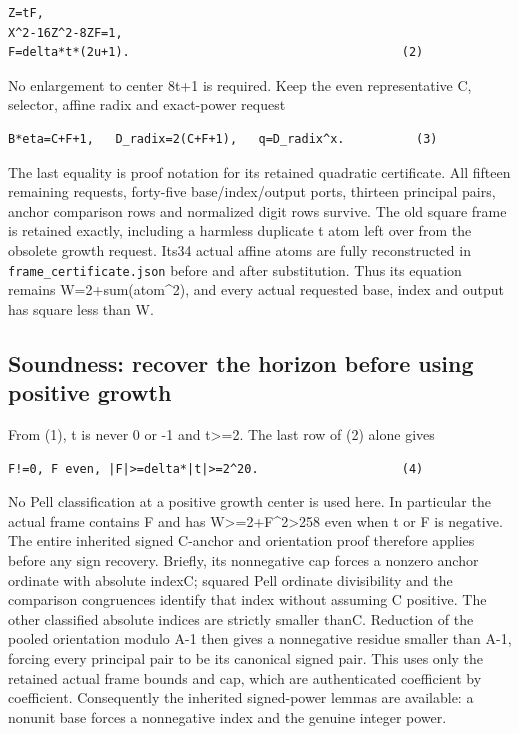 \begin{verbatim}
Z=tF,
X^2-16Z^2-8ZF=1,
F=delta*t*(2u+1).                                      (2)
\end{verbatim}

No enlargement to center 8t+1 is required. Keep the even representative
C, selector, affine radix and exact-power request

\begin{verbatim}
B*eta=C+F+1,   D_radix=2(C+F+1),   q=D_radix^x.          (3)
\end{verbatim}

The last equality is proof notation for its retained quadratic
certificate. All fifteen remaining requests, forty-five
base/index/output ports, thirteen principal pairs, anchor comparison
rows and normalized digit rows survive. The old square frame is retained
exactly, including a harmless duplicate t atom left over from the
obsolete growth request. Its34 actual affine atoms are fully
reconstructed in \nolinkurl{frame_certificate.json} before and after
substitution. Thus its equation remains W=2+sum(atom\^{}2), and every
actual requested base, index and output has square less than W.

\subsection{Soundness: recover the horizon before using positive
growth}\label{soundness-recover-the-horizon-before-using-positive-growth}

From (1), t is never 0 or -1 and \textbar t\textbar\textgreater=2. The
last row of (2) alone gives

\begin{verbatim}
F!=0, F even, |F|>=delta*|t|>=2^20.                    (4)
\end{verbatim}

No Pell classification at a positive growth center is used here. In
particular the actual frame contains F and has
W\textgreater=2+F\^{}2\textgreater258 even when t or F is negative. The
entire inherited signed C-anchor and orientation proof therefore applies
before any sign recovery. Briefly, its nonnegative cap forces a nonzero
anchor ordinate with absolute index\textbar C\textbar; squared Pell
ordinate divisibility and the comparison congruences identify that index
without assuming C positive. The other classified absolute indices are
strictly smaller than\textbar C\textbar. Reduction of the pooled
orientation modulo A-1 then gives a nonnegative residue smaller than
\textbar A-1\textbar, forcing every principal pair to be its canonical
signed pair. This uses only the retained actual frame bounds and cap,
which are authenticated coefficient by coefficient. Consequently the
inherited signed-power lemmas are available: a nonunit base forces a
nonnegative index and the genuine integer power.

